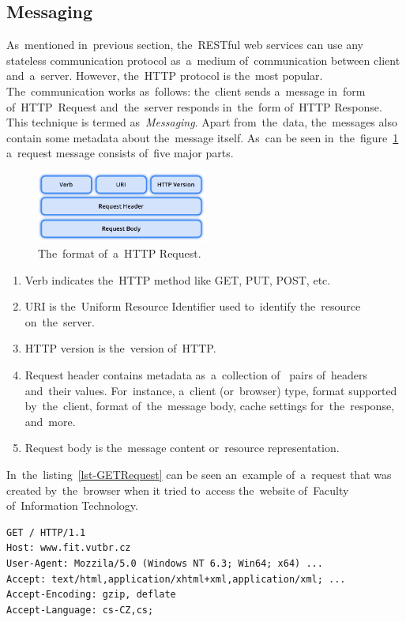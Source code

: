 \subsection{Messaging}
As~mentioned in~previous section, the~RESTful web services can use any stateless
communication protocol as~a~medium of~communication between client and~a~server.
However, the~HTTP protocol is the~most popular. The~communication works
as~follows: the~client sends a~message in~form of~HTTP~Request and~the~server
responds in~the~form of~HTTP Response. This technique is termed
as~\textit{Messaging}. Apart from~the~data, the~messages also contain some
metadata about the~message itself. As~can be seen
in~the~figure~\ref{fig-HTTPRequest} a~request message consists of~five major
parts.

\begin{figure}[!hbt]
	\centering
	\includegraphics[width=0.5\textwidth]{./figures/http-request.pdf}
	\caption{The~format of~a~HTTP Request.}
	\label{fig-HTTPRequest}
\end{figure}

\begin{enumerate}
  \item Verb indicates the~HTTP method like GET, PUT, POST, etc.
  \item URI is the~Uniform Resource Identifier used to~identify the~resource
  on~the~server.
  \item HTTP version is the~version of~HTTP.
  \item Request header contains metadata as~a~collection of~ pairs
  of~headers and~their values. For~instance, a~client (or~browser) type, format
  supported by~the~client, format of~the~message body, cache settings
  for~the~response, and~more.
  \item Request body is the~message content or~resource representation.
\end{enumerate}

In~the~listing~\ref{lst-GETRequest} can be seen an~example of~a~request that was
created by~the~browser when it tried to~access the~website of~Faculty
of~Information Technology.

\vspace{1mm}
\begin{lstlisting}[caption=An~example of~a~simplified GET request made
by~the~browser., label=lst-GETRequest, style=dp-default]
GET / HTTP/1.1
Host: www.fit.vutbr.cz
User-Agent: Mozzila/5.0 (Windows NT 6.3; Win64; x64) ...
Accept: text/html,application/xhtml+xml,application/xml; ...
Accept-Encoding: gzip, deflate
Accept-Language: cs-CZ,cs;
\end{lstlisting}

